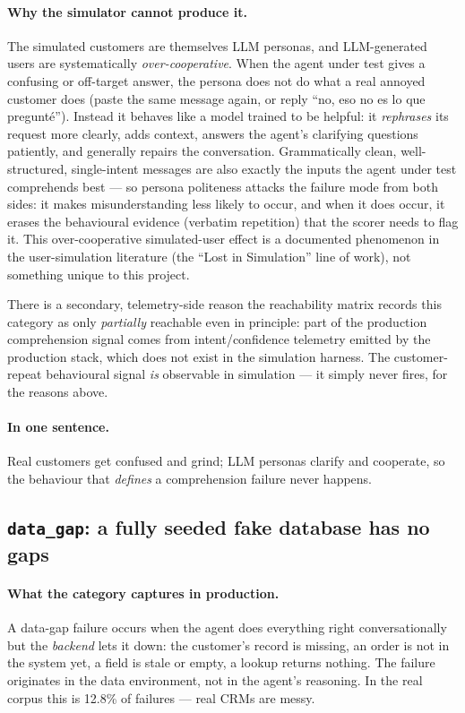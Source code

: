 \documentclass[11pt,a4paper]{article}
\newcommand{\cat}[1]{\texttt{#1}}
\begin{document}
\paragraph{Why the simulator cannot produce it.}
The simulated customers are themselves LLM personas, and LLM-generated users are systematically
\emph{over-cooperative}. When the agent under test gives a confusing or off-target answer, the
persona does not do what a real annoyed customer does (paste the same message again, or reply
``no, eso no es lo que pregunt\'e''). Instead it behaves like a model trained to be helpful: it
\emph{rephrases} its request more clearly, adds context, answers the agent's clarifying questions
patiently, and generally repairs the conversation. Grammatically clean, well-structured,
single-intent messages are also exactly the inputs the agent under test comprehends best --- so
persona politeness attacks the failure mode from both sides: it makes misunderstanding less likely
to occur, and when it does occur, it erases the behavioural evidence (verbatim repetition) that the
scorer needs to flag it. This over-cooperative simulated-user effect is a documented phenomenon in
the user-simulation literature (the ``Lost in Simulation'' line of work), not something unique to
this project.

There is a secondary, telemetry-side reason the reachability matrix records this category as only
\emph{partially} reachable even in principle: part of the production comprehension signal comes
from intent/confidence telemetry emitted by the production stack, which does not exist in the
simulation harness. The customer-repeat behavioural signal \emph{is} observable in simulation ---
it simply never fires, for the reasons above.

\paragraph{In one sentence.} Real customers get confused and grind; LLM personas clarify and
cooperate, so the behaviour that \emph{defines} a comprehension failure never happens.

\subsection{\cat{data\_gap}: a fully seeded fake database has no gaps}

\paragraph{What the category captures in production.}
A data-gap failure occurs when the agent does everything right conversationally but the
\emph{backend} lets it down: the customer's record is missing, an order is not in the system yet,
a field is stale or empty, a lookup returns nothing. The failure originates in the data
environment, not in the agent's reasoning. In the real corpus this is 12.8\% of failures --- real
CRMs are messy.
\end{document}
